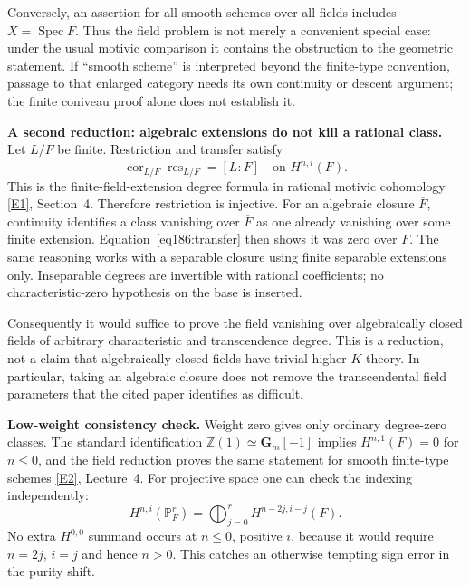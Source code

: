 \documentclass[11pt,a4paper]{article}
\newcommand{\Z}{\mathbb{Z}}
\newcommand{\PP}{\mathbb P}
\newcommand{\eref}[2]{\hyperlink{extra:#1:#2}{[E#2]}}
\numberwithin{equation}{section}
\begin{document}
Conversely, an assertion for all smooth schemes over all fields includes $X=\operatorname{Spec}F$. Thus the field problem is not merely a convenient special case: under the usual motivic comparison it contains the obstruction to the geometric statement. If ``smooth scheme'' is interpreted beyond the finite-type convention, passage to that enlarged category needs its own continuity or descent argument; the finite coniveau proof alone does not establish it.

\textbf{A second reduction: algebraic extensions do not kill a rational class.} Let $L/F$ be finite. Restriction and transfer satisfy
\begin{equation}\label{eq186:transfer}
 \operatorname{cor}_{L/F}\operatorname{res}_{L/F}=[L:F]
 \quad\text{on }H^{n,i}(F).
\end{equation}
This is the finite-field-extension degree formula in rational motivic cohomology \eref{186}{1}, Section~4. Therefore restriction is injective. For an algebraic closure $\overline F$, continuity identifies a class vanishing over $\overline F$ as one already vanishing over some finite extension. Equation~\eqref{eq186:transfer} then shows it was zero over $F$. The same reasoning works with a separable closure using finite separable extensions only. Inseparable degrees are invertible with rational coefficients; no characteristic-zero hypothesis on the base is inserted.

Consequently it would suffice to prove the field vanishing over algebraically closed fields of arbitrary characteristic and transcendence degree. This is a reduction, not a claim that algebraically closed fields have trivial higher $K$-theory. In particular, taking an algebraic closure does not remove the transcendental field parameters that the cited paper identifies as difficult.

\textbf{Low-weight consistency check.} Weight zero gives only ordinary degree-zero classes. The standard identification $\Z(1)\simeq\mathbf G_m[-1]$ implies $H^{n,1}(F)=0$ for $n\le0$, and the field reduction proves the same statement for smooth finite-type schemes \eref{186}{2}, Lecture~4. For projective space one can check the indexing independently:
\[
 H^{n,i}(\PP^r_F)=\bigoplus_{j=0}^{r}H^{n-2j,i-j}(F).
\]
No extra $H^{0,0}$ summand occurs at $n\le0$, positive $i$, because it would require $n=2j$, $i=j$ and hence $n>0$. This catches an otherwise tempting sign error in the purity shift.
\end{document}

